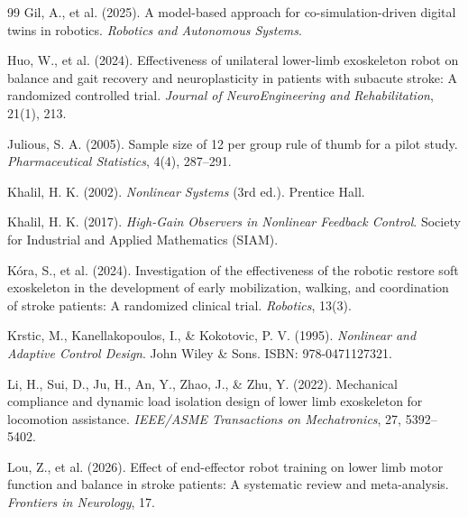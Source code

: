 \documentclass[a4paper,12pt]{article}
\begin{document}
\begin{thebibliography}{99}
    Gil, A., et al. (2025).
    \newblock A model-based approach for co-simulation-driven digital twins in robotics.
    \newblock \emph{Robotics and Autonomous Systems}.

    Huo, W., et al. (2024).
    \newblock Effectiveness of unilateral lower-limb exoskeleton robot on balance and gait recovery and neuroplasticity in patients with subacute stroke: A randomized controlled trial.
    \newblock \emph{Journal of NeuroEngineering and Rehabilitation}, 21(1), 213.

    Julious, S. A. (2005).
    \newblock Sample size of 12 per group rule of thumb for a pilot study.
    \newblock \emph{Pharmaceutical Statistics}, 4(4), 287--291.

    Khalil, H. K. (2002).
    \newblock \emph{Nonlinear Systems} (3rd ed.).
    \newblock Prentice Hall.

    Khalil, H. K. (2017).
    \newblock \emph{High-Gain Observers in Nonlinear Feedback Control}.
    \newblock Society for Industrial and Applied Mathematics (SIAM).

    K{\'o}ra, S., et al. (2024).
    \newblock Investigation of the effectiveness of the robotic restore soft exoskeleton in the development of early mobilization, walking, and coordination of stroke patients: A randomized clinical trial.
    \newblock \emph{Robotics}, 13(3).

    Krstic, M., Kanellakopoulos, I., \& Kokotovic, P. V. (1995).
    \newblock \emph{Nonlinear and Adaptive Control Design}.
    \newblock John Wiley \& Sons. ISBN: 978-0471127321.

    Li, H., Sui, D., Ju, H., An, Y., Zhao, J., \& Zhu, Y. (2022).
    \newblock Mechanical compliance and dynamic load isolation design of lower limb exoskeleton for locomotion assistance.
    \newblock \emph{IEEE/ASME Transactions on Mechatronics}, 27, 5392--5402.

    Lou, Z., et al. (2026).
    \newblock Effect of end-effector robot training on lower limb motor function and balance in stroke patients: A systematic review and meta-analysis.
    \newblock \emph{Frontiers in Neurology}, 17.


\end{thebibliography}
\end{document}
